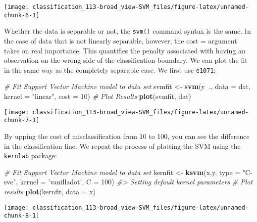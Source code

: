 \documentclass[]{book}
\newenvironment{Shaded}{\begin{snugshade}}{\end{snugshade}}
\newcommand{\CommentTok}[1]{\textcolor[rgb]{0.56,0.35,0.01}{\textit{#1}}}
\newcommand{\DataTypeTok}[1]{\textcolor[rgb]{0.13,0.29,0.53}{#1}}
\newcommand{\DecValTok}[1]{\textcolor[rgb]{0.00,0.00,0.81}{#1}}
\newcommand{\KeywordTok}[1]{\textcolor[rgb]{0.13,0.29,0.53}{\textbf{#1}}}
\newcommand{\NormalTok}[1]{#1}
\newcommand{\OperatorTok}[1]{\textcolor[rgb]{0.81,0.36,0.00}{\textbf{#1}}}
\newcommand{\StringTok}[1]{\textcolor[rgb]{0.31,0.60,0.02}{#1}}
\begin{document}
\begin{center}\texttt{[image: classification\_113-broad\_view-SVM\_files/figure-latex/unnamed-chunk-6-1]} \end{center}

Whether the data is separable or not, the \texttt{svm()} command syntax is the same. In the case of data that is not linearly separable, however, the cost = argument takes on real importance. This quantifies the penalty associated with having an observation on the wrong side of the classification boundary. We can plot the fit in the same way as the completely separable case. We first use \texttt{e1071}:

\begin{Shaded}
\begin{Highlighting}[]
\CommentTok{# Fit Support Vector Machine model to data set}
\NormalTok{svmfit <-}\StringTok{ }\KeywordTok{svm}\NormalTok{(y}\OperatorTok{~}\NormalTok{., }\DataTypeTok{data =}\NormalTok{ dat, }\DataTypeTok{kernel =} \StringTok{"linear"}\NormalTok{, }\DataTypeTok{cost =} \DecValTok{10}\NormalTok{)}
\CommentTok{# Plot Results}
\KeywordTok{plot}\NormalTok{(svmfit, dat)}
\end{Highlighting}
\end{Shaded}

\begin{center}\texttt{[image: classification\_113-broad\_view-SVM\_files/figure-latex/unnamed-chunk-7-1]} \end{center}

By upping the cost of misclassification from 10 to 100, you can see the difference in the classification line. We repeat the process of plotting the SVM using the \texttt{kernlab} package:

\begin{Shaded}
\begin{Highlighting}[]
\CommentTok{# Fit Support Vector Machine model to data set}
\NormalTok{kernfit <-}\StringTok{ }\KeywordTok{ksvm}\NormalTok{(x,y, }\DataTypeTok{type =} \StringTok{"C-svc"}\NormalTok{, }\DataTypeTok{kernel =} \StringTok{'vanilladot'}\NormalTok{, }\DataTypeTok{C =} \DecValTok{100}\NormalTok{)}
\CommentTok{#>  Setting default kernel parameters}
\CommentTok{# Plot results}
\KeywordTok{plot}\NormalTok{(kernfit, }\DataTypeTok{data =}\NormalTok{ x)}
\end{Highlighting}
\end{Shaded}

\begin{center}\texttt{[image: classification\_113-broad\_view-SVM\_files/figure-latex/unnamed-chunk-8-1]} \end{center}
\end{document}
